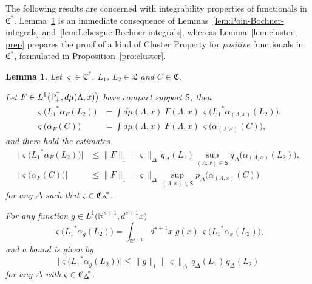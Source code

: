 \documentclass[a4paper,a4paper]{article}
\numberwithin{equation}{section}
\newcommand{\Cfrak}{\mathfrak{C}}
\newcommand{\Lfrak}{\mathfrak{L}}
\newcommand{\Ssf}{\mathsf{S}}
\newcommand{\Rsone}{\mathbb{R}^{s + 1}}
\newcommand{\Poin}{\mathsf{P}_{\negthinspace +}^\uparrow}
\newcommand{\Cstar}{\mathfrak{C}^*}
\newcommand{\CDstar}{{\mathfrak{C}_\Delta}^{\negthickspace *}}
\newcommand{\aLax}{\alpha_{( \Lambda , x )}}
\newcommand{\ax}{\alpha_x}
\newcounter{propitem}
\newenvironment{proplist}{\begin{list}{(\roman{propitem})}%
  {\usecounter{propitem} \setlength{\topsep}{0ex}%
   \setlength{\parsep}{0.2ex} \setlength{\itemsep}{0.4ex}%
   \setlength{\leftmargin}{0em} \setlength{\itemindent}{0.5em}%
   }}{\end{list}}
\theoremstyle{definition}
\theoremstyle{plain}
\newtheorem{lemma}[definition]{Lemma}
\theoremstyle{remark}
\newcommand{\babs}[1]{\bigl\lvert #1 \bigr\rvert}
\newcommand{\norm}[1]{\lVert #1 \rVert}
\newcommand{\bpDx}[1]{p_\Delta \bigl( #1 \bigr)}
\newcommand{\qDx}[1]{q_\Delta ( #1 )}
\newcommand{\bqDx}[1]{q_\Delta \bigl( #1 \bigr)}
\begin{document}
  The following results are concerned with integrability properties of
  functionals in $\Cstar$. Lemma~\ref{lem:varsigma-integrals} is an
  immediate consequence of Lemmas~\ref{lem:Poin-Bochner-integrals}
  and~\ref{lem:Lebesgue-Bochner-integrals}, whereas
  Lemma~\ref{lem:cluster-prep} prepares the proof of a kind of Cluster
  Property for \emph{positive} functionals in $\Cstar$, formulated in
  Proposition~\ref{pro:cluster}.
  \begin{lemma}
    \label{lem:varsigma-integrals}
    Let $\varsigma \in \Cstar$, $L_1$, $L_2 \in \Lfrak$ and $C
    \in \Cfrak$.
    \begin{proplist}
    \item Let $F \in L^1 \bigl( \Poin , d \mu ( \Lambda , x ) \bigr)$
      have compact support $\Ssf$, then
      \begin{subequations}
        \begin{align}
          \varsigma \bigl( {L_1}^* \alpha_F ( L_2 ) \bigr) & = \int d
          \mu ( \Lambda , x ) \; F ( \Lambda , x ) \, \varsigma \bigl(
          {L_1}^* \aLax ( L_2 ) \bigr) \text{,} \\
          \varsigma \bigl( \alpha_F ( C ) \bigr) & = \int d \mu (
          \Lambda , x ) \; F ( \Lambda , x ) \, \varsigma \bigl( \aLax
          ( C ) \bigr) \text{,}
        \end{align}
      \end{subequations}
      and there hold the estimates
      \begin{subequations}
        \begin{align}
          \babs{\varsigma \bigl( {L_1}^* \alpha_F ( L_2 ) \bigr)} &
          \leqslant \norm{F}_1 \norm{\varsigma}_\Delta \, \qDx{L_1}
          \sup_{( \Lambda , x ) \in \Ssf} \bqDx{\aLax ( L_2 )}
          \text{,} \\
          \babs{\varsigma \bigl( \alpha_F ( C ) \bigr)} & \leqslant
          \norm{F}_1 \norm{\varsigma}_\Delta \sup_{( \Lambda , x ) \in
          \Ssf} \bpDx{\aLax(C)}
        \end{align}
      \end{subequations}
      for any $\Delta$ such that $\varsigma \in \CDstar$.
    \item For any function $g \in L^1 \bigl( \Rsone , d^{s + 1} x
      \bigr)$
      \begin{equation}
        \varsigma \bigl( {L_1}^* \alpha_g ( L_2 ) \bigr) =
        \int_{\Rsone} d^{s + 1} x \; g ( x ) \, \varsigma \bigl(
        {L_1}^* \ax ( L_2 ) \bigr) \text{,}
      \end{equation}
      and a bound is given by
      \begin{equation}
        \babs{\varsigma \bigl( {L_1}^* \alpha_g ( L_2 ) \bigr)}
        \leqslant \norm{g}_1 \norm{\varsigma}_\Delta \, \qDx{L_1} \,
        \qDx{L_2}
      \end{equation}
      for any $\Delta$ with $\varsigma \in \CDstar$.
    \end{proplist}
  \end{lemma}
\end{document}
